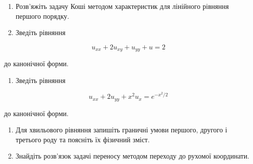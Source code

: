 \documentclass[
  ukrainian,
]{article}
\providecommand{\tightlist}{%
  \setlength{\itemsep}{0pt}\setlength{\parskip}{0pt}}
\begin{document}
\begin{enumerate}
\def\labelenumi{\arabic{enumi}.}
\item
  Розв'яжіть задачу Коші методом характеристик для лінійного рівняння
  першого порядку.
\item
  Зведіть рівняння
\end{enumerate}

\[
u_{xx} + 2u_{xy} + u_{yy} + u = 2
\]

до канонічної форми.

\begin{enumerate}
\def\labelenumi{\arabic{enumi}.}
\setcounter{enumi}{2}
\tightlist
\item
  Зведіть рівняння
\end{enumerate}

\[
u_{xx} + 2u_{yy} + x^2 u_x = e^{-x^2/2}
\]

до канонічної форми.

\begin{enumerate}
\def\labelenumi{\arabic{enumi}.}
\setcounter{enumi}{3}
\item
  Для хвильового рівняння запишіть граничні умови першого, другого і
  третього роду та поясніть їх фізичний зміст.
\item
  Знайдіть розв'язок задачі переносу методом переходу до рухомої
  координати.
\end{enumerate}
\end{document}
